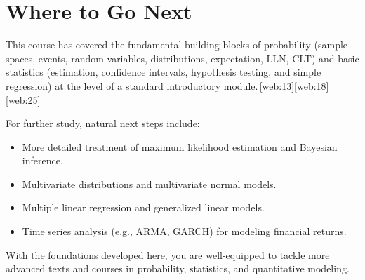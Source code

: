 \documentclass[11pt,a4paper]{article}
\begin{document}
\newpage

\section{Where to Go Next}

This course has covered the fundamental building blocks of probability (sample spaces, events, random variables, distributions, expectation, LLN, CLT) and basic statistics (estimation, confidence intervals, hypothesis testing, and simple regression) at the level of a standard introductory module.\,[web:13][web:18][web:25]

For further study, natural next steps include:
\begin{itemize}
    \item More detailed treatment of maximum likelihood estimation and Bayesian inference.
    \item Multivariate distributions and multivariate normal models.
    \item Multiple linear regression and generalized linear models.
    \item Time series analysis (e.g., ARMA, GARCH) for modeling financial returns.
\end{itemize}

With the foundations developed here, you are well-equipped to tackle more advanced texts and courses in probability, statistics, and quantitative modeling.
\end{document}

